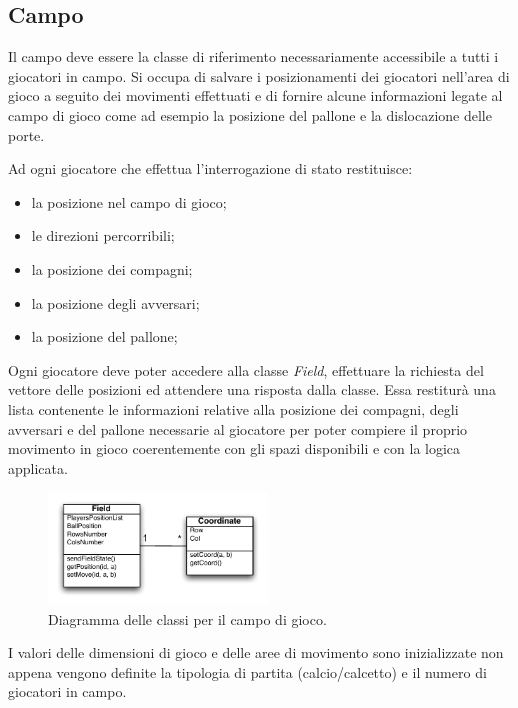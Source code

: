 \documentclass[aps,letterpaper,10pt]{article}
\begin{document}
\subsection{Campo}

Il campo deve essere la classe di riferimento necessariamente accessibile a tutti i giocatori in campo. Si occupa di
salvare i posizionamenti dei giocatori nell'area di gioco a seguito dei movimenti effettuati e di fornire alcune
informazioni legate al campo di gioco come ad esempio la posizione del pallone e la dislocazione delle porte.
\vspace{3mm}

Ad ogni giocatore che effettua l'interrogazione di stato restituisce:

\begin{itemize}
	\item la posizione nel campo di gioco;
	\item le direzioni percorribili;
	\item la posizione dei compagni;
	\item la posizione degli avversari;
	\item la posizione del pallone;
\end{itemize}

Ogni giocatore deve poter accedere alla classe \emph{Field}, effettuare la richiesta del vettore delle posizioni ed
attendere una risposta dalla classe. Essa restitur\`a una lista contenente le informazioni relative alla posizione dei
compagni, degli avversari e del pallone necessarie al giocatore per poter compiere il proprio movimento in gioco
coerentemente con gli spazi disponibili e con la logica applicata. \vspace{3mm}

\begin{figure}[H]
	\begin{center}
		\includegraphics[width=220px]{images/field-class.pdf}
	\end{center}
\caption{Diagramma delle classi per il campo di gioco.}
\end{figure}

I valori delle dimensioni di gioco e delle aree di movimento sono inizializzate non appena vengono definite la tipologia
di partita (calcio/calcetto) e il numero di giocatori in campo. \vspace{3mm}
\end{document}
